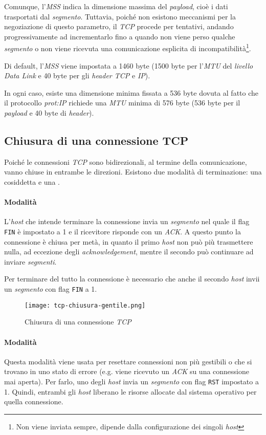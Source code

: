 Comunque, l'\emph{MSS} indica la dimensione massima del \emph{payload}, cioè i
dati trasportati dal \emph{segmento}. Tuttavia, poiché non esistono meccanismi
per la negoziazione di questo parametro, il \emph{TCP} procede per
tentativi, andando progressivamente ad incrementarlo fino a quando non viene
perso qualche \emph{segmento} o non viene ricevuta una comunicazione esplicita di
incompatibilità\footnote{Non viene inviata sempre, dipende dalla configurazione
dei singoli \emph{host}}.

Di default, l'\emph{MSS} viene impostata a 1460 byte (1500 byte per l'\emph{MTU}
del \emph{livello Data Link} e 40 byte per gli \emph{header TCP} e \emph{IP}).

In ogni caso, esiste una dimensione minima fissata a 536 byte dovuta al fatto
che il protocollo \emph{\gls{prot:IP}} richiede una \emph{MTU} minima
di 576 byte (536 byte per il \emph{payload} e 40 byte di \emph{header}).

\subsection{Chiusura di una connessione TCP}
Poiché le connessioni \emph{TCP} sono bidirezionali, al termine della comunicazione,
vanno chiuse in entrambe le direzioni. Esistono due modalità di terminazione:
una cosiddetta  e una .

\paragraph{Modalità }
L'\emph{host} che intende terminare la connessione invia un \emph{segmento} nel
quale il flag \texttt{FIN} è impostato a 1 e il ricevitore risponde con un \emph{ACK}.
A questo punto la connessione è chiusa per metà, in quanto il primo \emph{host}
non può più trasmettere nulla, ad eccezione degli \emph{acknowledgement}, mentre
il secondo può continuare ad inviare \emph{segmenti}.

Per terminare del tutto la connessione è necessario che anche il secondo
\emph{host} invii un \emph{segmento} con flag \texttt{FIN} a 1.

\begin{figure}[h!]
    \centering
    \texttt{[image: tcp-chiusura-gentile.png]}
    \caption{Chiusura  di una connessione \emph{TCP}}
\end{figure}

\paragraph{Modalità }
Questa modalità viene usata per resettare connessioni non più gestibili o
che si trovano in uno stato di errore (e.g. viene ricevuto un \emph{ACK} su una
connessione mai aperta). Per farlo, uno degli \emph{host} invia un
\emph{segmento} con flag \texttt{RST} impostato a 1. Quindi, entrambi gli
\emph{host} liberano le risorse allocate dal sistema operativo per quella
connessione.

